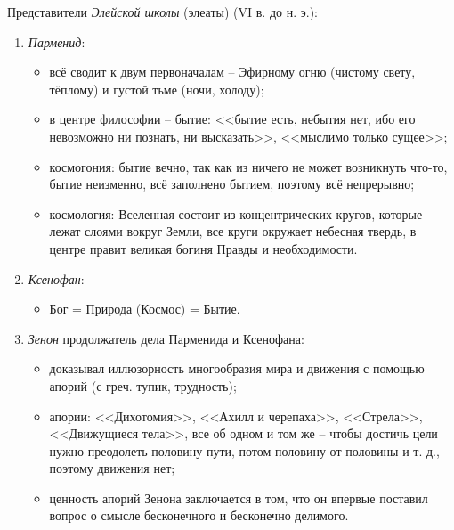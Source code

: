 Представители \textit{Элейской школы} (элеаты) (VI в. до н. э.):
\begin{enumerate}
	\itemsep-1ex
	\item \textit{Парменид}:
	\begin{itemize}
		\itemsep-.5ex
		\item всё сводит к двум первоначалам -- Эфирному огню (чистому свету, тёплому) и густой тьме (ночи, холоду);
		\item в центре философии -- бытие: <<бытие есть, небытия нет, ибо его невозможно ни познать, ни высказать>>, <<мыслимо только сущее>>;
		\item космогония: бытие вечно, так как из ничего не может возникнуть что-то, бытие неизменно, всё заполнено бытием, поэтому всё непрерывно;
		\item космология: Вселенная состоит из концентрических кругов, которые лежат слоями вокруг Земли, все круги окружает небесная твердь, в центре правит великая богиня Правды и необходимости.
	\end{itemize}
	\item \textit{Ксенофан}:
	\begin{itemize}
		\itemsep-.5ex
		\item Бог = Природа (Космос) = Бытие.
	\end{itemize}
	\item \textit{Зенон} продолжатель дела Парменида и Ксенофана:
	\begin{itemize}
		\itemsep-.5ex
		\item доказывал иллюзорность многообразия мира и движения с помощью апорий (с греч. тупик, трудность); 
		\item апории: <<Дихотомия>>, <<Ахилл и черепаха>>, <<Стрела>>, <<Движущиеся тела>>, все об одном и том же -- чтобы достичь цели нужно преодолеть половину пути, потом половину от половины и т. д., поэтому движения нет;
		\item ценность апорий Зенона заключается в том, что он впервые поставил вопрос о смысле бесконечного и бесконечно делимого.
	\end{itemize}
\end{enumerate}

